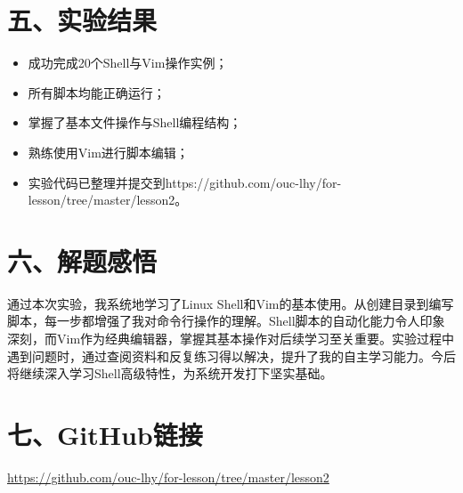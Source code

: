 \documentclass[a4paper, 12pt]{article}
\begin{document}
\section*{五、实验结果}
\begin{itemize}
    \item 成功完成20个Shell与Vim操作实例；
    \item 所有脚本均能正确运行；
    \item 掌握了基本文件操作与Shell编程结构；
    \item 熟练使用Vim进行脚本编辑；
    \item 实验代码已整理并提交到https://github.com/ouc-lhy/for-lesson/tree/master/lesson2。
\end{itemize}

\section*{六、解题感悟}
通过本次实验，我系统地学习了Linux Shell和Vim的基本使用。从创建目录到编写脚本，每一步都增强了我对命令行操作的理解。Shell脚本的自动化能力令人印象深刻，而Vim作为经典编辑器，掌握其基本操作对后续学习至关重要。实验过程中遇到问题时，通过查阅资料和反复练习得以解决，提升了我的自主学习能力。今后将继续深入学习Shell高级特性，为系统开发打下坚实基础。

\section*{七、GitHub链接}
\url{https://github.com/ouc-lhy/for-lesson/tree/master/lesson2}
\end{document}
